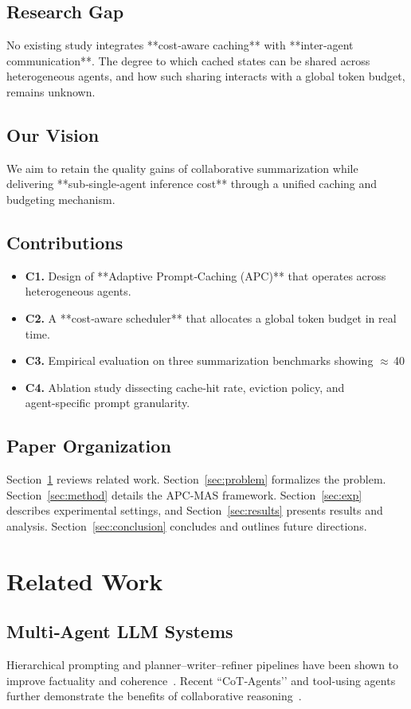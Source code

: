 \documentclass[conference]{IEEEtran}
\begin{document}
\subsection{Research Gap}
No existing study integrates **cost‑aware caching** with **inter‑agent communication**.  The degree to which cached states can be shared across heterogeneous agents, and how such sharing interacts with a global token budget, remains unknown.

\subsection{Our Vision}
We aim to retain the quality gains of collaborative summarization while delivering **sub‑single‑agent inference cost** through a unified caching and budgeting mechanism.

\subsection{Contributions}
\begin{itemize}
\item \textbf{C1.} Design of **Adaptive Prompt‑Caching (APC)** that operates across heterogeneous agents.
\item \textbf{C2.} A **cost‑aware scheduler** that allocates a global token budget in real time.
\item \textbf{C3.} Empirical evaluation on three summarization benchmarks showing $\approx$ 40 %
\item \textbf{C4.} Ablation study dissecting cache‑hit rate, eviction policy, and agent‑specific prompt granularity.
\end{itemize}

\subsection{Paper Organization}
Section~\ref{sec:related} reviews related work. Section~\ref{sec:problem} formalizes the problem. Section~\ref{sec:method} details the APC‑MAS framework. Section~\ref{sec:exp} describes experimental settings, and Section~\ref{sec:results} presents results and analysis. Section~\ref{sec:conclusion} concludes and outlines future directions.

\section{Related Work}\label{sec:related}
\subsection{Multi‑Agent LLM Systems}
Hierarchical prompting and planner–writer–refiner pipelines have been shown to improve factuality and coherence~\cite{liu2024hierarchical, chen2023tool}.  Recent “CoT‑Agents’’ and tool‑using agents further demonstrate the benefits of collaborative reasoning~\cite{gao2023tool}.
\end{document}

